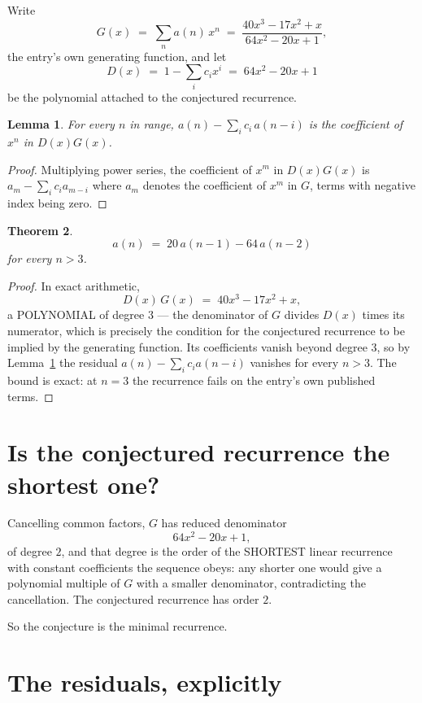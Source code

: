\documentclass[11pt,a4paper]{article}
\theoremstyle{plain}
\newtheorem{theorem}{Theorem}
\newtheorem{lemma}[theorem]{Lemma}
\theoremstyle{definition}
\begin{document}
Write
\[
G(x)\;=\;\sum_{n}a(n)\,x^{n}\;=\;\frac{40 x^{3} - 17 x^{2} + x}{64 x^{2} - 20 x + 1},
\]
the entry's own generating function, and let
\[
D(x)\;=\;1-\sum_i c_i x^{i}\;=\;64 x^{2} - 20 x + 1
\]
be the polynomial attached to the conjectured recurrence.

\begin{lemma}\label{lem:key}
For every $n$ in range, $a(n)-\sum_i c_i\,a(n-i)$ is the coefficient of $x^{n}$ in
$D(x)G(x)$.
\end{lemma}

\begin{proof}
Multiplying power series, the coefficient of $x^{m}$ in $D(x)G(x)$ is
$a_m-\sum_i c_i a_{m-i}$ where $a_m$ denotes the coefficient of $x^{m}$ in $G$, terms with
negative index being zero.
\end{proof}

\begin{theorem}
\[
a(n)\;=\;20\,a(n-1) - 64\,a(n-2)
\]
for every $n>3$.
\end{theorem}

\begin{proof}
In exact arithmetic,
\[
D(x)\,G(x)\;=\;40 x^{3} - 17 x^{2} + x,
\]
a POLYNOMIAL of degree $3$ --- the denominator of $G$ divides $D(x)$ times its numerator,
which is precisely the condition for the conjectured recurrence to be implied by the
generating function. Its coefficients vanish beyond degree $3$, so by
Lemma~\ref{lem:key} the residual $a(n)-\sum_ic_ia(n-i)$ vanishes for every
$n>3$. The bound is exact: at $n=3$ the recurrence fails on the entry's own published terms.
\end{proof}

\section{Is the conjectured recurrence the shortest one?}

Cancelling common factors, $G$ has reduced denominator
\[
64 x^{2} - 20 x + 1,
\]
of degree $2$, and that degree is the order of the SHORTEST linear recurrence with
constant coefficients the sequence obeys: any shorter one would give a polynomial multiple of
$G$ with a smaller denominator, contradicting the cancellation. The conjectured recurrence has
order $2$.

So the conjecture is the minimal recurrence.

\section{The residuals, explicitly}
\end{document}
